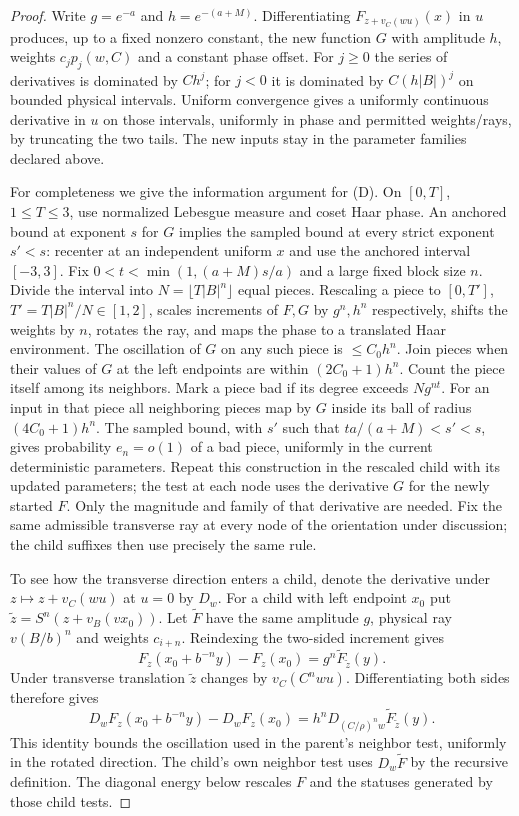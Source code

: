 \documentclass[11pt,a4paper]{article}
\begin{document}
\begin{proof}
Write $g=e^{-a}$ and $h=e^{-(a+M)}$. Differentiating $F_{z+v_C(wu)}(x)$ in $u$ produces, up to a fixed nonzero constant, the new function $G$ with amplitude $h$, weights $c_jp_j(w,C)$ and a constant phase offset. For $j\ge0$ the series of derivatives is dominated by $C h^j$; for $j<0$ it is dominated by $C(h|B|)^j$ on bounded physical intervals. Uniform convergence gives a uniformly continuous derivative in $u$ on those intervals, uniformly in phase and permitted weights/rays, by truncating the two tails. The new inputs stay in the parameter families declared above.

For completeness we give the information argument for (D). On $[0,T]$, $1\le T\le3$, use normalized Lebesgue measure and coset Haar phase. An anchored bound at exponent $s$ for $G$ implies the sampled bound at every strict exponent $s'<s$: recenter at an independent uniform $x$ and use the anchored interval $[-3,3]$. Fix $0<t<\min(1,(a+M)s/a)$ and a large fixed block size $n$. Divide the interval into $N=\lfloor T|B|^n\rfloor$ equal pieces. Rescaling a piece to $[0,T']$, $T'=T|B|^n/N\in[1,2]$, scales increments of $F,G$ by $g^n,h^n$ respectively, shifts the weights by $n$, rotates the ray, and maps the phase to a translated Haar environment. The oscillation of $G$ on any such piece is $\le C_0 h^n$. Join pieces when their values of $G$ at the left endpoints are within $(2C_0+1)h^n$. Count the piece itself among its neighbors. Mark a piece bad if its degree exceeds $Ng^{nt}$. For an input in that piece all neighboring pieces map by $G$ inside its ball of radius $(4C_0+1)h^n$. The sampled bound, with $s'$ such that $t a/(a+M)<s'<s$, gives probability $e_n=o(1)$ of a bad piece, uniformly in the current deterministic parameters. Repeat this construction in the rescaled child with its updated parameters; the test at each node uses the derivative $G$ for the newly started $F$. Only the magnitude and family of that derivative are needed. Fix the same admissible transverse ray at every node of the orientation under discussion; the child suffixes then use precisely the same rule.

To see how the transverse direction enters a child, denote the derivative
under $z\mapsto z+v_C(wu)$ at $u=0$ by $D_w$. For a child with left endpoint
$x_0$ put $\widetilde z=S^n(z+v_B(vx_0))$. Let $\widetilde F$ have
the same amplitude $g$, physical ray $v(B/b)^n$ and weights $c_{i+n}$.
Reindexing the two-sided increment gives
\[
 F_z(x_0+b^{-n}y)-F_z(x_0)=g^n\widetilde F_{\widetilde z}(y).
\]
Under transverse translation $\widetilde z$ changes by $v_C(C^n w u)$.
Differentiating both sides therefore gives
\[
 D_w F_z(x_0+b^{-n}y)-D_w F_z(x_0)
    = h^n D_{(C/\rho)^n w}\widetilde F_{\widetilde z}(y).
\]
This identity bounds the oscillation used in the parent's neighbor test,
uniformly in the rotated direction. The child's own neighbor test uses
$D_w\widetilde F$ by the recursive definition. The diagonal energy below
rescales $F$ and the statuses generated by those child tests.


\end{proof}
\end{document}
